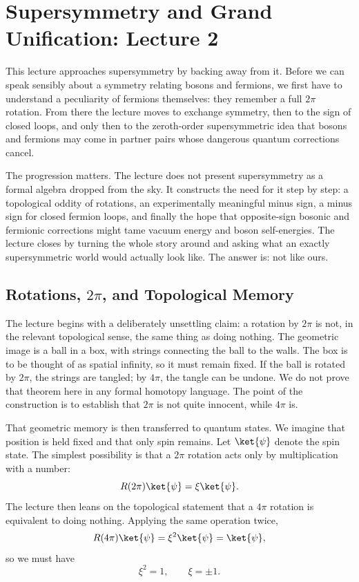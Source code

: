 \chapter{Supersymmetry and Grand Unification: Lecture 2}

This lecture approaches supersymmetry by backing away from it. Before we can speak sensibly about a symmetry relating bosons and fermions, we first have to understand a peculiarity of fermions themselves: they remember a full \(2\pi\) rotation. From there the lecture moves to exchange symmetry, then to the sign of closed loops, and only then to the zeroth-order supersymmetric idea that bosons and fermions may come in partner pairs whose dangerous quantum corrections cancel.

The progression matters. The lecture does not present supersymmetry as a formal algebra dropped from the sky. It constructs the need for it step by step: a topological oddity of rotations, an experimentally meaningful minus sign, a minus sign for closed fermion loops, and finally the hope that opposite-sign bosonic and fermionic corrections might tame vacuum energy and boson self-energies. The lecture closes by turning the whole story around and asking what an exactly supersymmetric world would actually look like. The answer is: not like ours.

\section{Rotations, \(2\pi\), and Topological Memory}

The lecture begins with a deliberately unsettling claim: a rotation by \(2\pi\) is not, in the relevant topological sense, the same thing as doing nothing. The geometric image is a ball in a box, with strings connecting the ball to the walls. The box is to be thought of as spatial infinity, so it must remain fixed. If the ball is rotated by \(2\pi\), the strings are tangled; by \(4\pi\), the tangle can be undone. We do not prove that theorem here in any formal homotopy language. The point of the construction is to establish that \(2\pi\) is not quite innocent, while \(4\pi\) is.

That geometric memory is then transferred to quantum states. We imagine that position is held fixed and that only spin remains. Let \(\ket{\psi}\) denote the spin state. The simplest possibility is that a \(2\pi\) rotation acts only by multiplication with a number:
\begin{equation}
R(2\pi)\ket{\psi}=\xi\ket{\psi}.
\end{equation}
The lecture then leans on the topological statement that a \(4\pi\) rotation is equivalent to doing nothing. Applying the same operation twice,
\begin{equation}
R(4\pi)\ket{\psi}=\xi^2\ket{\psi}=\ket{\psi},
\end{equation}
so we must have
\begin{equation}
\xi^2=1,
\qquad
\xi=\pm 1.
\end{equation}

